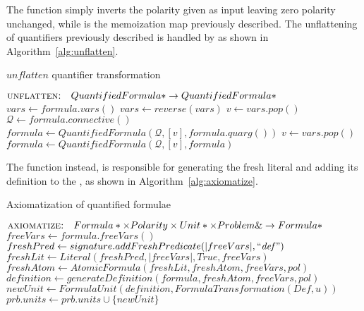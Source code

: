 The function  simply inverts the polarity given as input leaving zero polarity unchanged, while  is the memoization map previously described.
The unflattening of quantifiers previously described is handled by  as shown in Algorithm~\ref{alg:unflatten}.

\begin{algorithm}[H]
  \caption{\(unflatten\) quantifier transformation}\label{alg:unflatten}
    \begin{algorithmic}[1]
        \Statex{}  \(\textsc{unflatten:}\quad QuantifiedFormula*\to QuantifiedFormula*\)
            \State{} \(vars \gets formula.vars()\)
            \State{} \(vars \gets reverse(vars)\)
            \State{} \(v \gets vars.pop()\)
            \State{} \(\mathcal{Q} \gets formula.connective()\)
            \State{} \(formula \gets QuantifiedFormula(\mathcal{Q},[v],formula.quarg())\)
              \State{} \(v \gets vars.pop()\)
              \State{} \(formula \gets QuantifiedFormula(\mathcal{Q},[v],formula)\)
            \EndWhile{}
            \State{} 
        \EndFunction{}
    \end{algorithmic}
\end{algorithm}

The function  instead, is responsible for generating the fresh literal and adding its definition to the , as shown in Algorithm~\ref{alg:axiomatize}.

\begin{algorithm}[H]
  \caption{Axiomatization of quantified formulae}\label{alg:axiomatize}
    \begin{algorithmic}[1]
        \Statex{}  \(\textsc{axiomatize:}\quad Formula*\times Polarity\times Unit*\times Problem\&\to Formula*\)
            \State{} \(freeVars \gets formula.freeVars()\)
            \State{} \(freshPred \gets signature.addFreshPredicate(|freeVars|, \text{``\emph{def}''})\)
            \State{} \(freshLit \gets Literal(freshPred, |freeVars|, True, freeVars)\)
            \State{} \(freshAtom \gets AtomicFormula(freshLit,freshAtom,freeVars,pol)\)
            \State{} \(definition \gets generateDefinition(formula,freshAtom,freeVars,pol)\)
            \State{} \(newUnit \gets FormulaUnit(definition, FormulaTransformation(Def,u))\)
            \State{} \(prb.units \gets prb.units \cup \{newUnit\}\)
            \State{} 
        \EndFunction{}
    \end{algorithmic}  
\end{algorithm}

